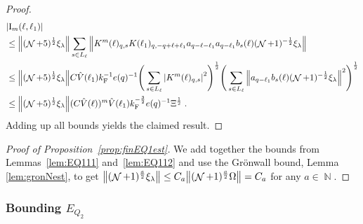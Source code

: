 \documentclass[12pt,a4paper]{article}
\numberwithin{equation}{section}
\newcommand{\1}{\mathbb{I}}
\newcommand{\F}{\mathrm{F}}
\newcommand{\I}{\mathrm{I}}
\DeclareMathOperator{\N}{\mathbb{N}}
\DeclareMathOperator{\NN}{\mathcal{N}}
\newcommand{\half}{\frac{1}{2}}
\theoremstyle{plain}
\theoremstyle{definition}
\theoremstyle{remark}
\theoremstyle{plain}
\theoremstyle{definition}
\theoremstyle{remark}
\begin{document}
\begin{proof}
{}
\begin{align}
	&|\I_m(\ell, \ell_1)| \nonumber\\
	&\leq \norm{(\NN+5)^{\half} \xi_\lambda}
		\sum\limits_{s \in L_{\ell}}
		\norm{ K^m(\ell)_{q,s} K(\ell_1)_{q,-q+\ell+\ell_1} a_{q-\ell-\ell_1} a_{q-\ell_1} b_{s}(\ell) (\NN+1)^{-\half} \xi_\lambda } \nonumber\\
	&\leq \norm{(\NN+5)^{\half} \xi_\lambda}
		C \hat{V}(\ell_1) k_{\F}^{-1} e(q)^{-1}
		\Bigg( \sum\limits_{s \in L_{\ell}} \abs{K^m(\ell)_{q,s}}^2\Bigg)^\half \Bigg(\sum\limits_{s \in L_{\ell}} \norm{ a_{q-\ell_1} b_s(\ell) (\NN+1)^{-\half} \xi_\lambda }^2\Bigg)^\half \nonumber\\
	&\leq \norm{(\NN+5)^\half \xi_\lambda }
		(C \hat{V}(\ell))^m
		\hat{V}(\ell_1)
		k_{\F}^{-\frac 32} e(q)^{-1} \Xi^\half \;. \label{eq:estEQ1123}
\end{align}
Adding up all bounds yields the claimed result.
\end{proof}


\begin{proof}[Proof of Proposition~\ref{prop:finEQ1est}]
We add together the bounds from Lemmas~\ref{lem:EQ111} and~\ref{lem:EQ112} and use the Gr\"onwall bound, Lemma \ref{lem:gronNest}, to get $ \norm{(\NN+1)^{\frac a2} \xi_\lambda} \le C_a \norm{(\NN+1)^{\frac a2} \Omega} = C_a $ for any $ a \in \N $.
\end{proof}






\subsubsection{Bounding $E_{Q_2}$}
\end{document}
